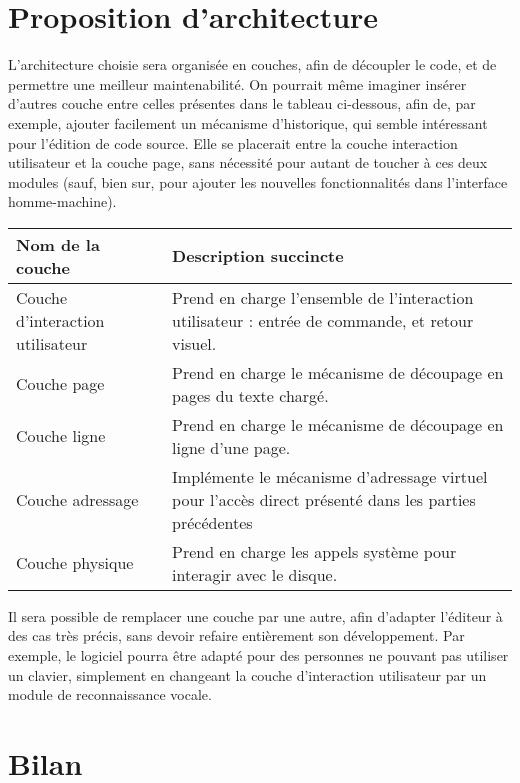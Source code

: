 \section{Proposition d'architecture}
L'architecture choisie sera organisée en couches, afin de découpler le code, et de
permettre une meilleur maintenabilité. On pourrait même imaginer insérer
d'autres couche entre celles présentes dans le tableau ci-dessous, afin de, par
exemple, ajouter facilement un mécanisme d'historique, qui semble intéressant
pour l'édition de code source. Elle se placerait entre la couche interaction
utilisateur et la couche page, sans nécessité pour autant de toucher à ces deux
modules (sauf, bien sur, pour ajouter les nouvelles fonctionnalités dans
l'interface homme-machine).

\begin{center}
    \begin{tabular}{l|p{7cm}}
	Nom de la couche & Description succincte \\
	\hline \hline
	Couche d'interaction utilisateur & Prend en charge l'ensemble de
	l'interaction utilisateur : entrée de commande, et retour visuel.\\
	\hline
	Couche page & Prend en charge le mécanisme de découpage en pages du
	texte chargé.\\
	\hline
	Couche ligne & Prend en charge le mécanisme de découpage en ligne d'une
	page.\\
	\hline
	Couche adressage & Implémente le mécanisme d'adressage virtuel pour
	l'accès direct présenté dans les parties précédentes\\
	\hline
	Couche physique & Prend en charge les appels système pour interagir
	avec le disque.\\
	\hline
    \end{tabular}
\end{center}

Il sera possible de remplacer une couche par une autre, afin d'adapter
l'éditeur à des cas très précis, sans devoir refaire entièrement son
développement. Par exemple, le logiciel pourra être adapté pour des personnes
ne pouvant pas utiliser un clavier, simplement en changeant la couche
d'interaction utilisateur par un module de reconnaissance vocale.


\section{Bilan}

